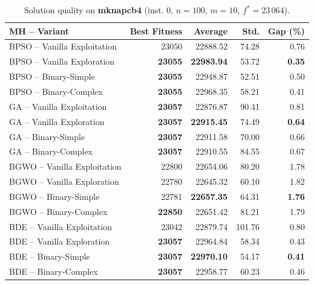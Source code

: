 \begin{table}[htbp]
  \centering
  \small
  \caption{Solution quality on \textbf{mknapcb4} (inst. 0, $n=100$, $m=10$, $f^*=23\,064$).}
  \label{tab:calidad_mknapcb4_0}
  \begin{tabular}{lrrrr}
    \toprule
    \textbf{MH -- Variant} &
    \textbf{Best Fitness} &
    \textbf{Average} &
    \textbf{Std.} &
    \textbf{Gap (\%)} \\
    \midrule
    BPSO -- Vanilla Exploitation &          23050 &         22888.52 &  74.28 &         0.76 \\
    BPSO -- Vanilla Exploration  & \textbf{23055} & \textbf{22983.94} &  53.72 & \textbf{0.35} \\
    BPSO -- Binary-Simple        & \textbf{23055} &         22948.87 &  52.51 &         0.50 \\
    BPSO -- Binary-Complex       & \textbf{23055} &         22968.35 &  58.21 &         0.41 \\
    \midrule
    GA -- Vanilla Exploitation   & \textbf{23057} &         22876.87 &  90.41 &         0.81 \\
    GA -- Vanilla Exploration    & \textbf{23057} & \textbf{22915.45} &  74.49 & \textbf{0.64} \\
    GA -- Binary-Simple          & \textbf{23057} &         22911.58 &  70.00 &         0.66 \\
    GA -- Binary-Complex         & \textbf{23057} &         22910.55 &  84.55 &         0.67 \\
    \midrule
    BGWO -- Vanilla Exploitation &          22800 &         22654.06 &  80.20 &         1.78 \\
    BGWO -- Vanilla Exploration  &          22780 &         22645.32 &  60.10 &         1.82 \\
    BGWO -- Binary-Simple        &          22781 & \textbf{22657.35} &  64.31 & \textbf{1.76} \\
    BGWO -- Binary-Complex       & \textbf{22850} &         22651.42 &  81.21 &         1.79 \\
    \midrule
    BDE -- Vanilla Exploitation  &          23042 &         22879.74 & 101.76 &         0.80 \\
    BDE -- Vanilla Exploration   & \textbf{23057} &         22964.84 &  58.34 &         0.43 \\
    BDE -- Binary-Simple         & \textbf{23057} & \textbf{22970.10} &  54.17 & \textbf{0.41} \\
    BDE -- Binary-Complex        & \textbf{23057} &         22958.77 &  60.23 &         0.46 \\
    \bottomrule
  \end{tabular}
\end{table}
